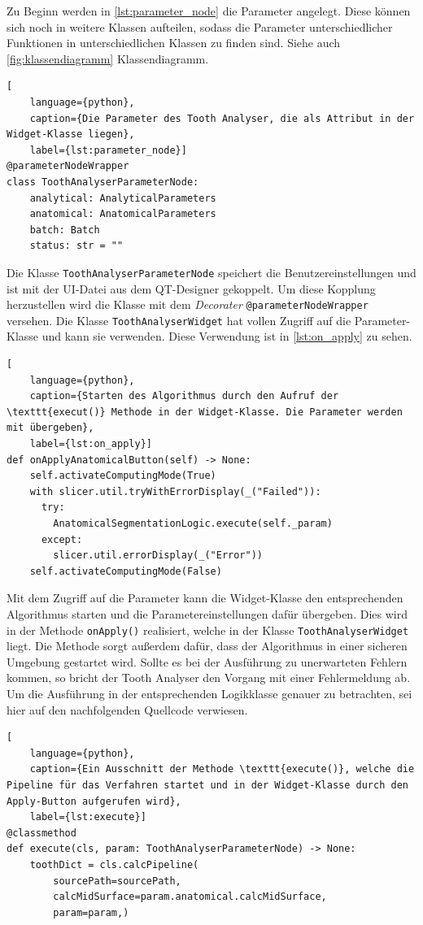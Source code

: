 Zu Beginn werden in \ref{lst:parameter_node} die Parameter angelegt. Diese können
sich noch in weitere Klassen aufteilen, sodass die Parameter unterschiedlicher
Funktionen in unterschiedlichen Klassen zu finden sind. Siehe auch \ref{fig:klassendiagramm}
Klassendiagramm.

\begin{lstlisting}[
    language={python},
    caption={Die Parameter des Tooth Analyser, die als Attribut in der Widget-Klasse liegen},
    label={lst:parameter_node}]
@parameterNodeWrapper
class ToothAnalyserParameterNode:
    analytical: AnalyticalParameters
    anatomical: AnatomicalParameters
    batch: Batch
    status: str = ""
\end{lstlisting}

Die Klasse \texttt{ToothAnalyserParameterNode} speichert die Benutzereinstellungen
und ist mit der \ac{UI}-Datei aus dem QT-Designer gekoppelt. Um diese Kopplung herzustellen
wird die Klasse mit dem \textit{Decorater} \texttt{@parameterNodeWrapper} versehen.
Die Klasse \texttt{ToothAnalyserWidget} hat vollen Zugriff auf die Parameter-Klasse
und kann sie verwenden. Diese Verwendung ist in \ref{lst:on_apply} zu sehen.

\begin{lstlisting}[
    language={python},
    caption={Starten des Algorithmus durch den Aufruf der \texttt{execut()} Methode in der Widget-Klasse. Die Parameter werden mit übergeben},
    label={lst:on_apply}]
def onApplyAnatomicalButton(self) -> None:
    self.activateComputingMode(True)
    with slicer.util.tryWithErrorDisplay(_("Failed")):
	  try:
	    AnatomicalSegmentationLogic.execute(self._param)
	  except:
	    slicer.util.errorDisplay(_("Error"))
    self.activateComputingMode(False)
\end{lstlisting}

Mit dem Zugriff auf die Parameter kann die Widget-Klasse den entsprechenden Algorithmus
starten und die Parametereinstellungen dafür übergeben. Dies wird in der Methode
\texttt{onApply()} realisiert, welche in der Klasse \texttt{ToothAnalyserWidget}
liegt. Die Methode sorgt außerdem dafür, dass der Algorithmus in einer sicheren Umgebung
gestartet wird. Sollte es bei der Ausführung zu unerwarteten Fehlern kommen, so bricht
der Tooth Analyser den Vorgang mit einer Fehlermeldung ab. Um die Ausführung in
der entsprechenden Logikklasse genauer zu betrachten, sei hier auf den nachfolgenden
Quellcode verwiesen.

\pagebreak

\begin{lstlisting}[
    language={python},
    caption={Ein Ausschnitt der Methode \texttt{execute()}, welche die Pipeline für das Verfahren startet und in der Widget-Klasse durch den Apply-Button aufgerufen wird},
    label={lst:execute}]
@classmethod
def execute(cls, param: ToothAnalyserParameterNode) -> None:
    toothDict = cls.calcPipeline(
	    sourcePath=sourcePath,
	    calcMidSurface=param.anatomical.calcMidSurface,
	    param=param,)
\end{lstlisting}

